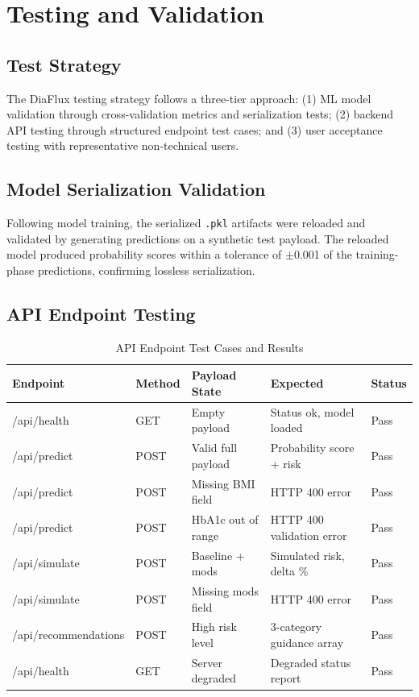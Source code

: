 \documentclass[12pt,a4paper]{report}
\begin{document}
\section{Testing and Validation}

\subsection{Test Strategy}
The DiaFlux testing strategy follows a three-tier approach: (1) ML model validation through cross-validation metrics and serialization tests; (2) backend API testing through structured endpoint test cases; and (3) user acceptance testing with representative non-technical users.

\subsection{Model Serialization Validation}
Following model training, the serialized \texttt{.pkl} artifacts were reloaded and validated by generating predictions on a synthetic test payload. The reloaded model produced probability scores within a tolerance of $\pm$0.001 of the training-phase predictions, confirming lossless serialization.

\subsection{API Endpoint Testing}
\begin{table}[H]
\centering
\caption{API Endpoint Test Cases and Results}
\label{tab:api_testing}
\begin{tabularx}{\textwidth}{llp{3cm}XX}
\toprule
\textbf{Endpoint} & \textbf{Method} & \textbf{Payload State} & \textbf{Expected} & \textbf{Status} \\
\midrule
/api/health        & GET  & Empty payload       & Status ok, model loaded      & Pass \\
/api/predict       & POST & Valid full payload  & Probability score + risk     & Pass \\
/api/predict       & POST & Missing BMI field   & HTTP 400 error               & Pass \\
/api/predict       & POST & HbA1c out of range  & HTTP 400 validation error    & Pass \\
/api/simulate      & POST & Baseline + mods     & Simulated risk, delta \%     & Pass \\
/api/simulate      & POST & Missing mods field  & HTTP 400 error               & Pass \\
/api/recommendations & POST & High risk level   & 3-category guidance array    & Pass \\
/api/health        & GET  & Server degraded     & Degraded status report       & Pass \\
\bottomrule
\end{tabularx}
\end{table}
\end{document}
